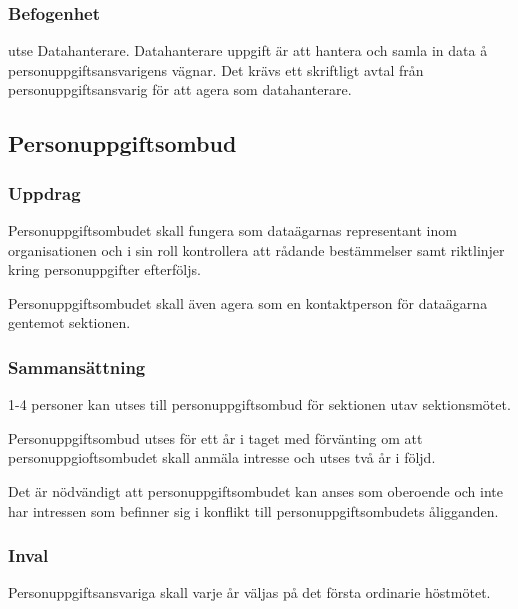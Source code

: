 \subsubsection{Befogenhet}
\begin{att}
    \item utse Datahanterare. Datahanterare uppgift är att hantera och samla in data å personuppgiftsansvarigens vägnar. Det krävs ett skriftligt avtal från personuppgiftsansvarig för att agera som datahanterare.
\end{att}

\subsection{Personuppgiftsombud}

\subsubsection{Uppdrag}
 Personuppgiftsombudet skall fungera som dataägarnas representant inom organisationen och i sin roll kontrollera att rådande bestämmelser samt riktlinjer kring personuppgifter efterföljs.
 
 Personuppgiftsombudet skall även agera som en kontaktperson för dataägarna gentemot sektionen.

\subsubsection{Sammansättning}
1-4 personer kan utses till personuppgiftsombud för sektionen utav sektionsmötet.

Personuppgiftsombud utses för ett år i taget med förvänting om att personuppgioftsombudet skall anmäla intresse och utses två år i följd.

Det är nödvändigt att personuppgiftsombudet kan anses som oberoende och inte har intressen som befinner sig i konflikt till personuppgiftsombudets åligganden.

\subsubsection{Inval}
Personuppgiftsansvariga skall varje år väljas på det första ordinarie höstmötet.
